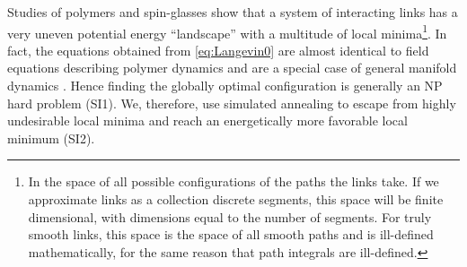 \documentclass[nofootinbib,preprint,floatfix,endfloats]{revtex4} %
\begin{document}
Studies of polymers and spin-glasses show that a system of interacting links has a very uneven potential energy ``landscape'' \cite{parisi2002physical} with a multitude of local minima\footnote{In the space of all possible configurations of the paths the links take.
If we approximate links as a collection discrete segments, this space will be finite dimensional, with dimensions equal to the number of segments. 
For truly smooth links, this space is the space of all smooth paths and is ill-defined mathematically, for the same reason that path integrals are ill-defined.}.
In fact, 
the equations obtained from \eqref{eq:Langevin0} are almost identical to field equations describing polymer dynamics and are a special case of general manifold dynamics \cite{mezard1991replica}. 
Hence finding the globally optimal configuration is %
generally an NP hard problem (SI1).
We, therefore, use simulated annealing \cite{hwang1988simulated} to escape from highly undesirable local minima and reach an energetically more favorable local minimum (SI2). 

\end{document}
